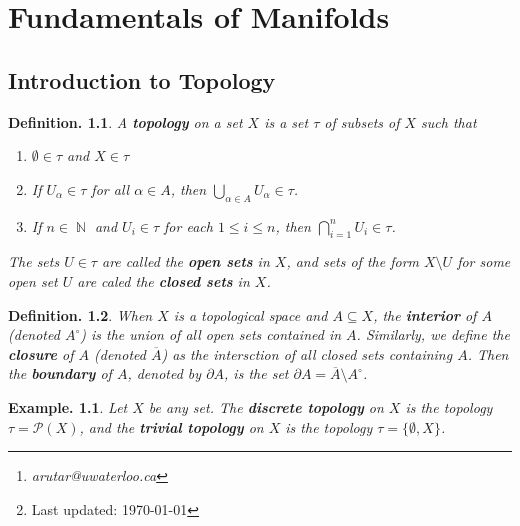 \documentclass[11pt, a4paper]{memoir}
\title{\subject}
\author{Alex Rutar\thanks{\itshape arutar@uwaterloo.ca}\\ University of Waterloo}
\date{\semester\thanks{Last updated: \today}}
\DeclareMathOperator{\N}{{\mathbb{N}}}
\theoremstyle{change}
\theoremstyle{plain}
\theoremstyle{nonumberplain}
\newtheorem{definition}{Definition.}
\newtheorem{example}{Example.}
\numberwithin{equation}{section}
\begin{document}
\hypersetup{pageanchor=false}
\maketitle
\newpage
\frontmatter
\hypersetup{pageanchor=true}
\tableofcontents*
\newpage
\mainmatter


\chapter{Fundamentals of Manifolds}
\section{Introduction to Topology}
\begin{definition}
    A \textbf{topology} on a set $X$ is a set $\tau$ of subsets of $X$ such that
    \begin{enumerate}[nl,r]
        \item $\emptyset\in\tau$ and $X\in\tau$
        \item If $U_\alpha\in\tau$ for all $\alpha\in A$, then $\bigcup_{\alpha\in A}U_\alpha\in\tau$.
        \item If $n\in\N$ and $U_i\in\tau$ for each $1\leq i\leq n$, then $\bigcap_{i=1}^n U_i\in\tau$.
    \end{enumerate}
    The sets $U\in\tau$ are called the \textbf{open sets} in $X$, and sets of the form $X\setminus U$ for some open set $U$ are caled the \textbf{closed sets} in $X$.
\end{definition}
\begin{definition}
    When $X$ is a topological space and $A\subseteq X$, the \textbf{interior} of $A$ (denoted $A^\circ$) is the union of all open sets contained in $A$.
    Similarly, we define the \textbf{closure} of $A$ (denoted $\overline{A}$) as the intersction of all closed sets containing $A$.
    Then the \textbf{boundary} of $A$, denoted by $\partial A$, is the set $\partial A=\overline{A}\setminus A^\circ$.
\end{definition}
\begin{example}
    Let $X$ be any set.
    The \textbf{discrete topology} on $X$ is the topology $\tau=\mathcal{P}(X)$, and the \textbf{trivial topology} on $X$ is the topology $\tau=\{\emptyset,X\}$.
\end{example}
\end{document}
